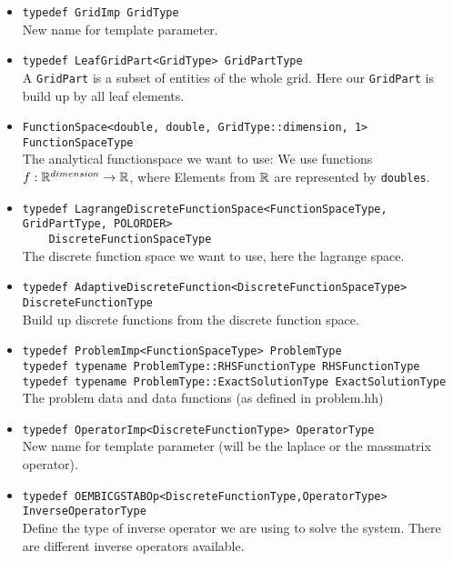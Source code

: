 \begin{itemize}
 \item \lstinline!typedef GridImp GridType!\\
      New name for template parameter.

 \item \lstinline!typedef LeafGridPart<GridType> GridPartType!\\
      A \texttt{GridPart} is a subset of entities of the whole grid. Here our \texttt{GridPart} is build up by all leaf elements.

 \item \lstinline!FunctionSpace<double, double, GridType::dimension, 1>  FunctionSpaceType!\\
      The analytical functionspace we want to use: We use functions $f: \mathbb{R}^{dimension} \rightarrow \mathbb{R} $,
      where Elements from $\mathbb{R}$ are represented by \texttt{doubles}.

 \item \lstinline!typedef LagrangeDiscreteFunctionSpace<FunctionSpaceType, GridPartType, POLORDER>!\\
       \lstinline!    DiscreteFunctionSpaceType!\\
      The discrete function space we want to use, here the lagrange space.

 \item \lstinline!typedef AdaptiveDiscreteFunction<DiscreteFunctionSpaceType> DiscreteFunctionType!\\
      Build up discrete functions from the discrete function space.

 \item \lstinline!typedef ProblemImp<FunctionSpaceType> ProblemType!\\
       \lstinline!typedef typename ProblemType::RHSFunctionType RHSFunctionType!\\
       \lstinline!typedef typename ProblemType::ExactSolutionType ExactSolutionType!\\
      The problem data and data functions (as defined in problem.hh)

 \item \lstinline!typedef OperatorImp<DiscreteFunctionType> OperatorType!\\
      New name for template parameter (will be the laplace or the massmatrix operator).

 \item \lstinline!typedef OEMBICGSTABOp<DiscreteFunctionType,OperatorType> InverseOperatorType!\\
      Define the type of inverse operator we are using to solve the system. There are different inverse operators available.
\end{itemize}


